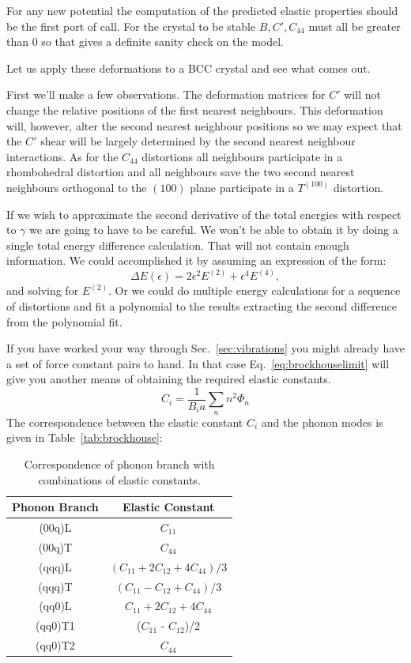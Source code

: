 For any new potential the computation of the predicted elastic properties should
be the first port of call. For the crystal to be stable $B,C',C_{44}$ must all be
greater than 0 so that gives a definite sanity check on the model. 

Let us apply these deformations to a BCC crystal and see what comes out.

First we'll make a few observations. The deformation matrices for
$C'$ will not change the relative positions of the first nearest neighbours.
This deformation will, however, alter the second nearest neighbour positions so we may expect
that the $C'$ shear will be largely determined by the second nearest neighbour interactions. 
As for the $C_{44}$ distortions all neighbours participate in a rhombohedral distortion
and all neighbours save the two second nearest neighbours orthogonal to the $(100)$
plane participate in a $T^{(100)}$ distortion. 

If we wish to approximate the second derivative of the total energies with 
respect to $\gamma$ we are going to have to be careful. We won't be able
to obtain it by doing a single total energy difference calculation. That
will not contain enough information. We could accomplished it by assuming
an expression of the form: 
\begin{equation}
\Delta E(\epsilon) = 2\epsilon^{2} E^{(2)} + \epsilon^{4} E^{(4)},
\end{equation}
and solving for $E^{(2)}$. Or we could do multiple energy calculations for a sequence 
of distortions and fit a polynomial to the results extracting
the second difference from the polynomial fit.

If you have worked your way through Sec.~\ref{sec:vibrations} you might already have
a set of force constant pairs to hand. In that case Eq.~\ref{eq:brockhouselimit} will give you
another means of obtaining the required elastic constants.
%
\begin{equation}
\label{eq:brockhouselimit}
C_{i} = \frac{1}{B_{i}a}\sum_{n} n^{2}\Phi_{n}
\end{equation}
%
The correspondence between the elastic constant $C_{i}$ and the phonon modes is given
in Table~\ref{tab:brockhouse}:

\begin{table}
\begin{center}
\begin{tabular}{|c|c|}
\hline
Phonon Branch  & Elastic Constant \\
\hline
(00q)L  & $C_{11}$ \\
(00q)T  & $C_{44}$ \\
(qqq)L  & $(C_{11}+2C_{12}+4C_{44})/3$ \\
(qqq)T  & $(C_{11}-C_{12}+C_{44})/3$ \\
(qq0)L  & $C_{11}+2C_{12}+4C_{44}$ \\
(qq0)T1 & ($C_{11}$ - $C_{12}$)/2\\
(qq0)T2 & $C_{44}$\\
\hline
\end{tabular}

\caption{Correspondence of phonon branch with combinations of elastic constants.}
\end{center}
\end{table}

